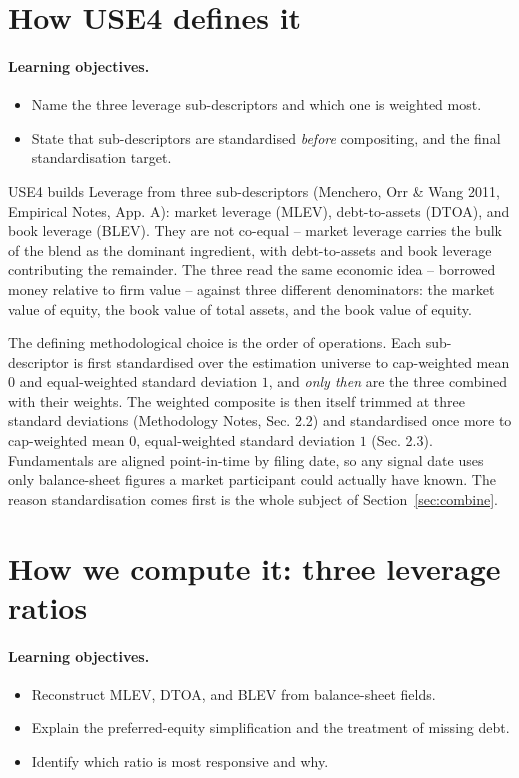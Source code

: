 \documentclass[11pt]{article}
\theoremstyle{definition}
\theoremstyle{plain}
\theoremstyle{remark}
\begin{document}
\section{How USE4 defines it}\label{sec:def}

\paragraph{Learning objectives.}
\begin{itemize}[leftmargin=1.4em,topsep=2pt]
  \item Name the three leverage sub-descriptors and which one is weighted most.
  \item State that sub-descriptors are standardised \emph{before} compositing, and the final standardisation target.
\end{itemize}

USE4 builds Leverage from three sub-descriptors (Menchero, Orr \& Wang 2011, Empirical Notes, App. A): market leverage (MLEV), debt-to-assets (DTOA), and book leverage (BLEV). They are not co-equal -- market leverage carries the bulk of the blend as the dominant ingredient, with debt-to-assets and book leverage contributing the remainder. The three read the same economic idea -- borrowed money relative to firm value -- against three different denominators: the market value of equity, the book value of total assets, and the book value of equity.

The defining methodological choice is the order of operations. Each sub-descriptor is first standardised over the estimation universe to cap-weighted mean $0$ and equal-weighted standard deviation $1$, and \emph{only then} are the three combined with their weights. The weighted composite is then itself trimmed at three standard deviations (Methodology Notes, Sec. 2.2) and standardised once more to cap-weighted mean $0$, equal-weighted standard deviation $1$ (Sec. 2.3). Fundamentals are aligned point-in-time by filing date, so any signal date uses only balance-sheet figures a market participant could actually have known. The reason standardisation comes first is the whole subject of Section~\ref{sec:combine}.

\section{How we compute it: three leverage ratios}\label{sec:compute}

\paragraph{Learning objectives.}
\begin{itemize}[leftmargin=1.4em,topsep=2pt]
  \item Reconstruct MLEV, DTOA, and BLEV from balance-sheet fields.
  \item Explain the preferred-equity simplification and the treatment of missing debt.
  \item Identify which ratio is most responsive and why.
\end{itemize}
\end{document}

